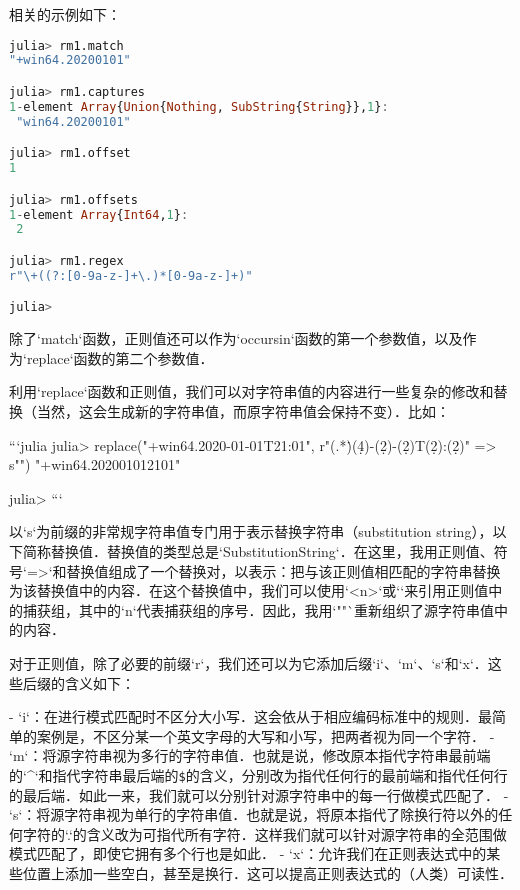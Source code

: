 相关的示例如下：
\begin{lstlisting}[language=julia]
julia> rm1.match
"+win64.20200101"

julia> rm1.captures
1-element Array{Union{Nothing, SubString{String}},1}:
 "win64.20200101"

julia> rm1.offset
1

julia> rm1.offsets
1-element Array{Int64,1}:
 2

julia> rm1.regex
r"\+((?:[0-9a-z-]+\.)*[0-9a-z-]+)"

julia> 
\end{lstlisting}

除了`match`函数，正则值还可以作为`occursin`函数的第一个参数值，以及作为`replace`函数的第二个参数值．

利用`replace`函数和正则值，我们可以对字符串值的内容进行一些复杂的修改和替换（当然，这会生成新的字符串值，而原字符串值会保持不变）．比如：

```julia
julia> replace("+win64.2020-01-01T21:01", r"(.*\.)(\d{4})-(\d{2})-(\d{2})T(\d{2}):(\d{2})" => s"\1\2\3\4\5\6")
"+win64.202001012101"

julia> 
```

以`s`为前缀的非常规字符串值专门用于表示替换字符串（substitution string），以下简称替换值．替换值的类型总是`SubstitutionString`．在这里，我用正则值、符号`=>`和替换值组成了一个替换对，以表示：把与该正则值相匹配的字符串替换为该替换值中的内容．在这个替换值中，我们可以使用`\g<n>`或`\n`来引用正则值中的捕获组，其中的`n`代表捕获组的序号．因此，我用`"\1\2\3\4\5\6"`重新组织了源字符串值中的内容．

对于正则值，除了必要的前缀`r`，我们还可以为它添加后缀`i`、`m`、`s`和`x`．这些后缀的含义如下：

- `i`：在进行模式匹配时不区分大小写．这会依从于相应编码标准中的规则．最简单的案例是，不区分某一个英文字母的大写和小写，把两者视为同一个字符．
- `m`：将源字符串视为多行的字符串值．也就是说，修改原本指代字符串最前端的`^`和指代字符串最后端的\verb|$|的含义，分别改为指代任何行的最前端和指代任何行的最后端．如此一来，我们就可以分别针对源字符串中的每一行做模式匹配了．
- `s`：将源字符串视为单行的字符串值．也就是说，将原本指代了除换行符以外的任何字符的`.`的含义改为可指代所有字符．这样我们就可以针对源字符串的全范围做模式匹配了，即使它拥有多个行也是如此．
- `x`：允许我们在正则表达式中的某些位置上添加一些空白，甚至是换行．这可以提高正则表达式的（人类）可读性．

